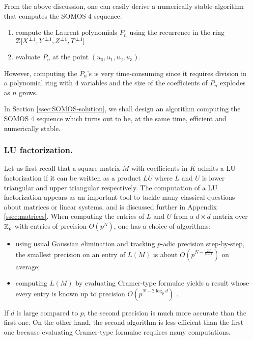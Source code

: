 \documentclass{lms}
\begin{document}
\begin{rmk}
From the above discussion, one can easily derive a numerically stable 
algorithm that computes the SOMOS 4 sequence: 
\begin{enumerate}
\item compute the Laurent polynomials $P_n$ using the recurrence in 
the ring $\mathbb Z[X^{\pm 1}, Y^{\pm 1}, Z^{\pm 1}, T^{\pm 1}]$
\item evaluate $P_n$ at the point $(u_0, u_1, u_2, u_3)$.
\end{enumerate}
However, computing the $P_n$'s is very time-consuming since it requires 
division in a polynomial ring with $4$ variables and the
size of the coefficients of $P_n$ explodes as $n$ grows.

In Section \ref{ssec:SOMOS-solution}, we shall design an algorithm computing 
the SOMOS 4 sequence which turns out to be, at the same time, efficient 
and numerically stable.
\end{rmk}

\subsubsection*{LU factorization.}

Let us first recall that a square matrix $M$ with coefficients in $K$ 
admits a LU factorization if it can be written as a product $LU$ where 
$L$ and $U$ is lower triangular and upper triangular respectively. 
The computation of a LU factorization appears as an important tool to 
tackle many classical questions about matrices or linear systems, and is
discussed further in Appendix \ref{ssec:matrices}.
When computing the entries of $L$ and $U$ from a $d \times d$ matrix
over $\mathbb Z_p$ with entries of precision $O(p^N)$, one has a choice of algorithms:
\begin{itemize}
\item using usual Gaussian elimination and tracking $p$-adic precision 
step-by-step, the smallest precision on an entry of $L(M)$ is about
$O(p^{N - \frac{2d}{p-1}})$ on average;
\item computing $L(M)$ by evaluating Cramer-type formulae yields a
result whose every entry is known up to precision $O(p^{N - 2 \log_p 
d})$ \cite{caruso:12a}.
\end{itemize}
If $d$ is large compared to $p$, the second precision is much more
accurate than the first one. On the other hand, the second algorithm
is less efficient than the first one because evaluating Cramer-type
formulae requires many computations. 
\end{document}
